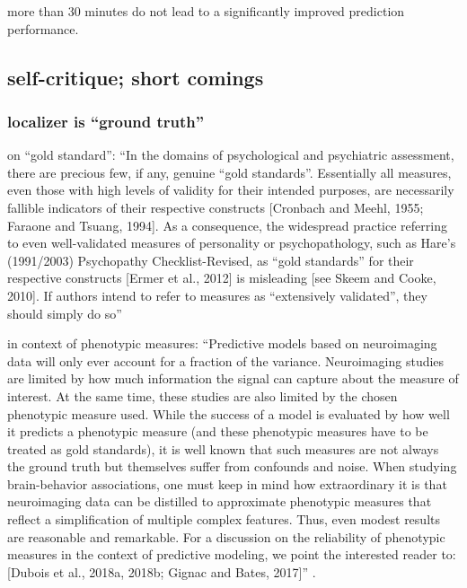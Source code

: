 %
more than 30 minutes do not lead to a significantly improved prediction
performance.
%

\subsection{self-critique; short comings}


\subsubsection{localizer is ``ground truth''}

\citet{lilienfeld2015fifty} on ``gold standard'': ``In the domains of
psychological and psychiatric assessment, there are precious few, if any,
genuine ``gold standards''. Essentially all measures, even those with high
levels of validity for their intended purposes, are necessarily fallible
indicators of their respective constructs [Cronbach and Meehl, 1955; Faraone and
Tsuang, 1994]. As a consequence, the widespread practice referring to even
well-validated measures of personality or psychopathology, such as Hare’s
(1991/2003) Psychopathy Checklist-Revised, as ``gold standards'' for their
respective constructs [Ermer et al., 2012] is misleading [see Skeem and Cooke,
2010]. If authors intend to refer to measures as ``extensively validated'', they
should simply do so'' \citep{lilienfeld2015fifty}

\citet{scheinost2019ten} in context of phenotypic measures: ``Predictive models
based on neuroimaging data will only ever account for a fraction of the
variance. Neuroimaging studies are limited by how much information the signal
can capture about the measure of interest. At the same time, these studies are
also limited by the chosen phenotypic measure used.  While the success of a
model is evaluated by how well it predicts a phenotypic measure (and these
phenotypic measures have to be treated as gold standards), it is well known that
such measures are not always the ground truth but themselves suffer from
confounds and noise.  When studying brain-behavior associations, one must keep
in mind how extraordinary it is that neuroimaging data can be distilled to
approximate phenotypic measures that reflect a simplification of multiple
complex features. Thus, even modest results are reasonable and remarkable. For
a discussion on the reliability of phenotypic measures in the context of
predictive modeling, we point the interested reader to: [Dubois et al., 2018a,
2018b; Gignac and Bates, 2017]'' \citep{scheinost2019ten}.

